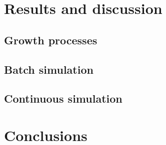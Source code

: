 \section{Results and discussion}
\subsection{Growth processes}

\subsection{Batch simulation}




\subsection{Continuous simulation}




\section{Conclusions}

